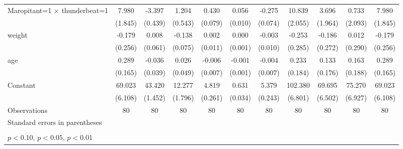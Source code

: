 \begin{table}[htbp]
\begin{tabular}{l*{10}{c}}
\addlinespace
Maropitant=1 $\times$ thunderbeat=1&       7.980\sym{***}&      -3.397\sym{***}&       1.204\sym{**} &       0.430\sym{***}&       0.056\sym{***}&      -0.275\sym{***}&      10.839\sym{***}&       3.696\sym{*}  &       0.733         &       7.980\sym{***}\\
                    &     (1.845)         &     (0.439)         &     (0.543)         &     (0.079)         &     (0.010)         &     (0.074)         &     (2.055)         &     (1.964)         &     (2.093)         &     (1.845)         \\
\addlinespace
weight              &      -0.179         &       0.008         &      -0.138\sym{*}  &       0.002         &       0.000         &      -0.003         &      -0.253         &      -0.186         &       0.012         &      -0.179         \\
                    &     (0.256)         &     (0.061)         &     (0.075)         &     (0.011)         &     (0.001)         &     (0.010)         &     (0.285)         &     (0.272)         &     (0.290)         &     (0.256)         \\
\addlinespace
age                 &       0.289\sym{*}  &      -0.036         &       0.026         &      -0.006         &      -0.001         &      -0.004         &       0.233         &       0.133         &       0.163         &       0.289\sym{*}  \\
                    &     (0.165)         &     (0.039)         &     (0.049)         &     (0.007)         &     (0.001)         &     (0.007)         &     (0.184)         &     (0.176)         &     (0.188)         &     (0.165)         \\
\addlinespace
Constant            &      69.023\sym{***}&      43.420\sym{***}&      12.277\sym{***}&       4.819\sym{***}&       0.631\sym{***}&       5.379\sym{***}&     102.380\sym{***}&      69.695\sym{***}&      75.270\sym{***}&      69.023\sym{***}\\
                    &     (6.108)         &     (1.452)         &     (1.796)         &     (0.261)         &     (0.034)         &     (0.243)         &     (6.801)         &     (6.502)         &     (6.927)         &     (6.108)         \\
\midrule
Observations        &          80         &          80         &          80         &          80         &          80         &          80         &          80         &          80         &          80         &          80         \\
\bottomrule
\multicolumn{11}{l}{\footnotesize Standard errors in parentheses}\\
\multicolumn{11}{l}{\footnotesize  }\\
\multicolumn{11}{l}{\footnotesize \sym{*} \(p<0.10\), \sym{**} \(p<0.05\), \sym{***} \(p<0.01\)}\\
\end{tabular}
\end{table}
